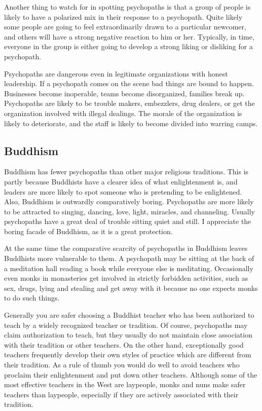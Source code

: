 \documentclass[a5paper,10pt,english]{book}
\begin{document}
\sphinxAtStartPar
Another thing to watch for in spotting psychopaths is that a group of
people is likely to have a polarized mix in their response to a
psychopath. Quite likely some people are going to feel extraordinarily
drawn to a particular newcomer, and others will have a strong negative
reaction to him or her. Typically, in time, everyone in the group is
either going to develop a strong liking or disliking for a psychopath.

\sphinxAtStartPar
Psychopaths are dangerous even in legitimate organizations with honest
leadership. If a psychopath comes on the scene bad things are bound to
happen. Businesses become inoperable, teams become disorganized,
families break up. Psychopaths are likely to be trouble makers,
embezzlers, drug dealers, or get the organization involved with illegal
dealings. The morale of the organization is likely to deteriorate, and
the staff is likely to become divided into warring camps.


\subsection{Buddhism}
\label{\detokenize{psychopaths:buddhism}}
\sphinxAtStartPar
Buddhism has fewer psychopaths than other major religious traditions.
This is partly because Buddhists have a clearer idea of what
enlightenment is, and leaders are more likely to spot someone who is
pretending to be enlightened. Also, Buddhism is outwardly comparatively
boring. Psychopaths are more likely to be attracted to singing, dancing,
love, light, miracles, and channeling. Usually psychopaths have a great
deal of trouble sitting quiet and still. I appreciate the boring facade
of Buddhism, as it is a great protection.

\sphinxAtStartPar
At the same time the comparative scarcity of psychopaths in Buddhism
leaves Buddhists more vulnerable to them. A psychopath may be sitting at
the back of a meditation hall reading a book while everyone else is
meditating. Occasionally even monks in monasteries get involved in
strictly forbidden activities, such as sex, drugs, lying and stealing
and get away with it because no one expects monks to do such things.

\sphinxAtStartPar
Generally you are safer choosing a Buddhist teacher who has been
authorized to teach by a widely recognized teacher or tradition. Of
course, psychopaths may claim authorization to teach, but they usually
do not maintain close association with their tradition or other
teachers. On the other hand, exceptionally good teachers frequently
develop their own styles of practice which are different from their
tradition. As a rule of thumb you would do well to avoid teachers who
proclaim their enlightenment and put down other teachers. Although some
of the most effective teachers in the West are laypeople, monks and nuns
make safer teachers than laypeople, especially if they are actively
associated with their tradition.
\end{document}

